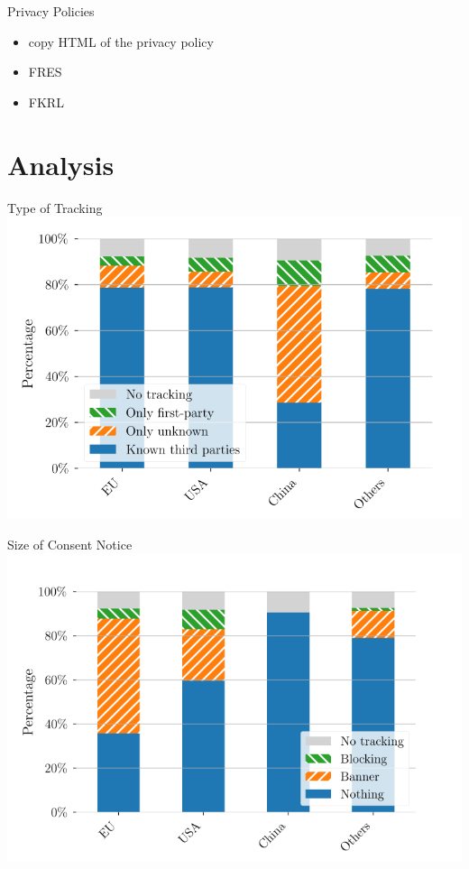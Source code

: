 \documentclass[xcolor={dvipsnames}]{beamer}
\begin{document}
\begin{frame}{Privacy Policies}
    \begin{itemize}
        \item copy HTML of the privacy policy
        \item FRES
        \item FKRL
    \end{itemize}
\end{frame}

\section{Analysis}

\begin{frame}{Type of Tracking}
    \centering
    \includegraphics[scale=0.36]{figures/tracking_kind_trans.png}
\end{frame}

\begin{frame}{Size of Consent Notice}
    \centering
    \includegraphics[scale=0.4]{figures/cookie_notice_size_trans.png}
\end{frame}
\end{document}
